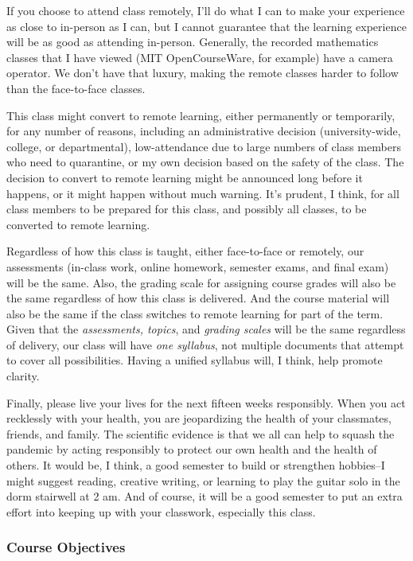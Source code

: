 \documentclass[12pt,fullpage]{article}
\newcounter{ex}\setcounter{ex}{0}
\begin{document}
If you choose to attend class remotely, I'll do what I can to make your experience as close to in-person as I can, but I cannot guarantee that the learning experience will be as good as attending in-person.
Generally, the recorded mathematics classes that I have viewed (MIT OpenCourseWare, for example) have a camera operator. We don't  have that luxury, making the remote classes harder to follow than the face-to-face classes.


This class might convert to remote learning, either permanently or temporarily,  for any number of reasons, including  an administrative decision (university-wide, college, or departmental), low-attendance due to  large numbers of class members who need to quarantine, or my own decision based on the safety of the class. The decision to convert to remote learning might be announced long before it happens, or it might happen without much warning. It's prudent, I think, for all class members to be prepared for this class, and possibly all classes, to be converted to remote learning. 

Regardless of how this class is taught, either face-to-face or remotely, our assessments (in-class work, online homework, semester exams, and final exam) will be the same. Also, the grading scale for assigning course grades will also be the same regardless of how this class is delivered.  And the course material will also be the same if the class switches to remote learning for part of the term.  Given that the \emph{assessments, topics}, and \emph{grading scales} will be the same regardless of delivery, our class will have \emph{one syllabus}, not multiple documents that attempt to cover all possibilities. Having a unified syllabus will, I think, help promote clarity.

Finally, please live your lives for the next fifteen weeks responsibly.  When you act recklessly with your health, you are jeopardizing the health of your classmates, friends, and family. The scientific evidence is that we all can help to squash the pandemic by acting responsibly to protect our own health and the health of others.  It would be, I think, a good semester to build or strengthen hobbies--I might suggest reading, creative writing, or learning to play the guitar solo in the dorm stairwell at 2 am.  And of course, it will be a good semester to put an extra effort into keeping up with your classwork, especially this class.


\subsubsection*{Course Objectives}
\end{document}
